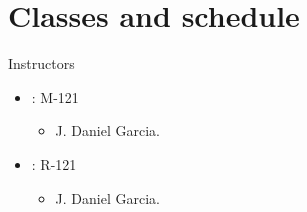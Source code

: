 \section{Classes and schedule}

\begin{frame}[t]{Instructors}
\begin{itemize}
  \item {}: M-121
    \begin{itemize}
      \item J. Daniel Garcia.
    \end{itemize}
  \item {}: R-121
    \begin{itemize}
      \item J. Daniel Garcia.
    \end{itemize}
\end{itemize}
\end{frame}


